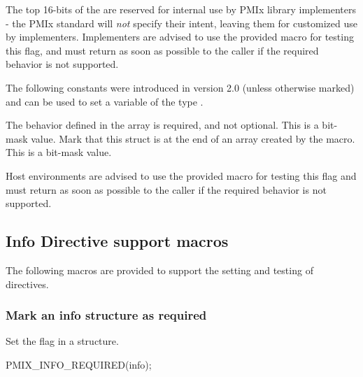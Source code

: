 \adviceimplstart
The top 16-bits of the  are reserved for internal use by \ac{PMIx} library implementers - the \ac{PMIx} standard will \textit{not} specify their intent, leaving them for customized use by implementers. Implementers are advised to use the provided  macro for testing this flag, and must return  as soon as possible to the caller if the required behavior is not supported.
\adviceimplend

The following constants were introduced in version 2.0 (unless otherwise marked) and can be used to set a variable of the type .

\begin{constantdesc}
%
The behavior defined in the  array is required, and not optional. This is a bit-mask value.
%
Mark that this  struct is at the end of an array created by the  macro. This is a bit-mask value.
%
\end{constantdesc}

\advicermstart
Host environments are advised to use the provided  macro for testing this flag and must return  as soon as possible to the caller if the required behavior is not supported.
\advicermend


\subsection{Info Directive support macros}

The following macros are provided to support the setting and testing of  directives.

\subsubsection{Mark an info structure as required}

\summary

Set the  flag in a  structure.

\cspecificstart
\begin{codepar}
PMIX_INFO_REQUIRED(info);
\end{codepar}
\cspecificend

